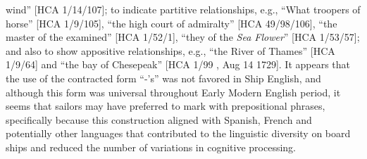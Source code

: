 wind” [HCA 1/14/107]; to indicate partitive relationships, e.g., “What troopers of horse” [HCA 1/9/105], “the high court of admiralty” [HCA 49/98/106], “the master of the examined” [HCA 1/52/1], “they of the \textit{Sea Flower}” [HCA 1/53/57]; and also to show appositive relationships, e.g., “the River of Thames” [HCA 1/9/64] and “the bay of Chesepeak” [HCA 1/99 , Aug 14 1729]. It appears that the use of the contracted form “-’s” was not favored in Ship English, and although this form was universal throughout Early Modern English period, it seems that sailors may have preferred to mark  with prepositional phrases, specifically because this construction aligned with Spanish, French and potentially other languages that contributed to the linguistic diversity on board ships and reduced the number of variations in cognitive processing.

